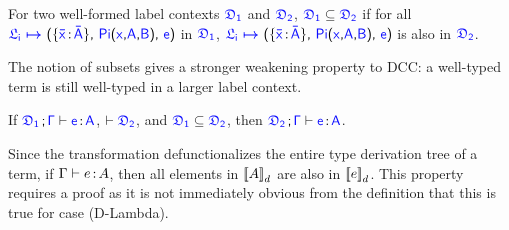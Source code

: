 \begin{definition} For two well-formed label contexts $\target{\fdef_1}$ and $\target{\fdef_2}$, $\target{\fdef_1} \subseteq \target{\fdef_2}$ if for all $\itemdef{\target{\flabel_i}}{\itemtype{\bar{x}}{\bar{A}}}{\targetpi{x}{A}{B}}{\target{e}}$ in $\target{\fdef_1}$, $\itemdef{\target{\flabel_i}}{\itemtype{\bar{x}}{\bar{A}}}{\targetpi{x}{A}{B}}{\target{e}}$ is also in $\target{\fdef_2}$.
\end{definition}

The notion of subsets gives a stronger weakening property to DCC: a well-typed term is still well-typed in a larger label context.

\begin{lemma} If $\target{\fdef_1} \semicolon \target{\Gamma} \vdash \itemtype{e}{A}$, $\vdash \target{\fdef_2}$, and $\target{\fdef_1} \subseteq \target{\fdef_2}$,
then $\target{\fdef_2} \semicolon \target{\Gamma} \vdash \itemtype{e}{A}$.
\end{lemma}

Since the transformation defunctionalizes the entire type derivation tree of a term, if $\Gamma \vdash e \hspace{0.5mm}{:}\hspace{0.5mm} A$, then all elements in ${[\![ A ]\!]}_d$ are also in ${[\![ e ]\!]}_d$. This property requires a proof as it is not immediately obvious from the definition that this is true for case (D-Lambda).

